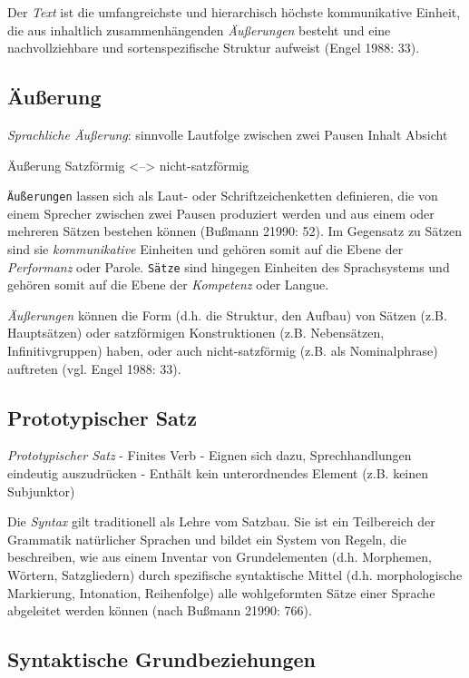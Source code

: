 \documentclass[
]{article}
\begin{document}
Der \emph{Text} ist die umfangreichste und hierarchisch höchste kommunikative Einheit, die aus inhaltlich zusammenhängenden \emph{Äußerungen} besteht und eine nachvollziehbare und sortenspezifische Struktur aufweist (Engel 1988: 33).

\hypertarget{uxe4uuxdferung}{%
\subsection{Äußerung}\label{uxe4uuxdferung}}

\emph{Sprachliche Äußerung}:
sinnvolle Lautfolge zwischen zwei Pausen
Inhalt Absicht

Äußerung
Satzförmig \textless--\textgreater{} nicht-satzförmig

\texttt{Äußerungen} lassen sich als Laut- oder Schriftzeichenketten definieren, die von einem Sprecher zwischen zwei Pausen produziert werden und aus einem oder mehreren Sätzen bestehen können (Bußmann 21990: 52). Im Gegensatz zu Sätzen sind sie \emph{kommunikative} Einheiten und gehören somit auf die Ebene der \emph{Performanz} oder Parole. \texttt{Sätze} sind hingegen Einheiten des Sprachsystems und gehören somit auf die Ebene der \emph{Kompetenz} oder Langue.

\emph{Äußerungen} können die Form (d.h. die Struktur, den Aufbau) von Sätzen (z.B. Hauptsätzen) oder satzförmigen Konstruktionen (z.B. Nebensätzen, Infinitivgruppen) haben, oder auch nicht-satzförmig (z.B. als Nominalphrase) auftreten (vgl. Engel 1988: 33).

\hypertarget{prototypischer-satz}{%
\subsection{Prototypischer Satz}\label{prototypischer-satz}}

\emph{Prototypischer Satz}
- Finites Verb
- Eignen sich dazu, Sprechhandlungen eindeutig auszudrücken
- Enthält kein unterordnendes Element (z.B. keinen Subjunktor)

Die \emph{Syntax} gilt traditionell als Lehre vom Satzbau. Sie ist ein Teilbereich der Grammatik natürlicher Sprachen und bildet ein System von Regeln, die beschreiben, wie aus einem Inventar von Grundelementen (d.h. Morphemen, Wörtern, Satzgliedern) durch spezifische syntaktische Mittel (d.h. morphologische Markierung, Intonation, Reihenfolge) alle wohlgeformten Sätze einer Sprache abgeleitet werden können (nach Bußmann 21990: 766).

\hypertarget{syntaktische-grundbeziehungen}{%
\subsection{Syntaktische Grundbeziehungen}\label{syntaktische-grundbeziehungen}}
\end{document}
